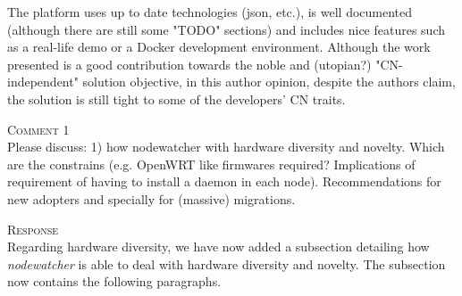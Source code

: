 \documentclass[12pt,twoside,a4paper]{report}
\newcommand{\nodewatcher}{\textit{nodewatcher}}
\begin{document}
The platform uses up to date technologies (json, etc.), is well documented (although there are still some "TODO" sections) and includes nice features such as a real-life demo or a Docker development environment. Although the work presented is a good contribution towards the noble and (utopian?) "CN-independent" solution objective, in this author opinion, despite the authors claim, the solution is still tight to some of the developers' CN traits.

\vspace{0.5cm}\noindent\textsc{Comment 1}\\
Please discuss: 1) how nodewatcher with hardware diversity and novelty. Which are the constrains (e.g. OpenWRT like firmwares required? Implications of requirement of having to install a daemon in each node). Recommendations for new adopters and specially for (massive) migrations.

\vspace{0.5cm}\noindent\textsc{Response}\\
Regarding hardware diversity, we have now added a subsection detailing how \nodewatcher{} is able to deal with hardware diversity and novelty.
The subsection now contains the following paragraphs.
\end{document}
